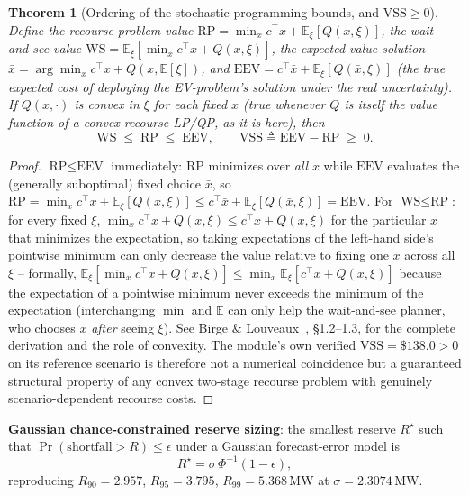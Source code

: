 \documentclass[11pt]{report}
\theoremstyle{plain}
\newtheorem{theorem}{Theorem}[chapter]
\theoremstyle{definition}
\theoremstyle{remark}
\begin{document}
\begin{theorem}[Ordering of the stochastic-programming bounds, and $\text{VSS}\ge0$]
\label{thm:vss}
Define the recourse problem value
$\text{RP}=\min_x c^\top x+\mathbb E_\xi[Q(x,\xi)]$, the wait-and-see
value $\text{WS}=\mathbb E_\xi[\min_x c^\top x+Q(x,\xi)]$, the
expected-value solution $\bar x=\arg\min_x c^\top x+Q(x,\mathbb
E[\xi])$, and $\text{EEV}=c^\top\bar x+\mathbb E_\xi[Q(\bar x,\xi)]$
(the true expected cost of deploying the EV-problem's solution under
the real uncertainty). If $Q(x,\cdot)$ is convex in $\xi$ for each fixed
$x$ (true whenever $Q$ is itself the value function of a convex
recourse LP/QP, as it is here), then
\begin{equation}
\text{WS}\;\le\;\text{RP}\;\le\;\text{EEV}, \qquad
\text{VSS}\triangleq\text{EEV}-\text{RP}\;\ge\;0.
\label{eq:vss-chain}
\end{equation}
\end{theorem}
\begin{proof}
$\text{RP}\le\text{EEV}$ immediately: $\text{RP}$ minimizes over
\emph{all} $x$ while $\text{EEV}$ evaluates the (generally suboptimal)
fixed choice $\bar x$, so $\text{RP}=\min_xc^\top x+\mathbb
E_\xi[Q(x,\xi)]\le c^\top\bar x+\mathbb E_\xi[Q(\bar x,\xi)]=
\text{EEV}$. For $\text{WS}\le\text{RP}$: for every fixed $\xi$,
$\min_xc^\top x+Q(x,\xi)\le c^\top x+Q(x,\xi)$ for the particular $x$
that minimizes the expectation, so taking expectations of the
left-hand side's pointwise minimum can only decrease the value relative
to fixing one $x$ across all $\xi$ -- formally, $\mathbb
E_\xi\left[\min_xc^\top x+Q(x,\xi)\right]\le\min_x\mathbb E_\xi\left[c^\top
x+Q(x,\xi)\right]$ because the expectation of a pointwise minimum never
exceeds the minimum of the expectation (interchanging $\min$ and
$\mathbb E$ can only help the wait-and-see planner, who chooses $x$
\emph{after} seeing $\xi$). See Birge \&
Louveaux~\cite{birgelouveaux}, \S1.2--1.3, for the complete
derivation and the role of convexity. The module's own verified
$\text{VSS}=\$138.0>0$ on its reference scenario is therefore not a
numerical coincidence but a guaranteed structural property of any
convex two-stage recourse problem with genuinely scenario-dependent
recourse costs.
\end{proof}

\textbf{Gaussian chance-constrained reserve sizing}: the smallest reserve
$R^\star$ such that $\Pr(\text{shortfall}>R)\le\epsilon$ under a Gaussian
forecast-error model is
\begin{equation}
R^\star = \sigma\,\Phi^{-1}(1-\epsilon),
\label{eq:chance}
\end{equation}
reproducing $R_{90}=2.957$, $R_{95}=3.795$, $R_{99}=5.368$\,MW at
$\sigma=2.3074$\,MW.
\end{document}

